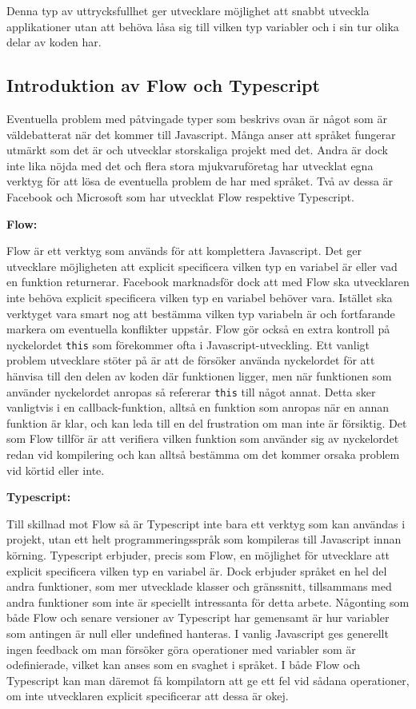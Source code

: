 Denna typ av uttrycksfullhet ger utvecklare möjlighet att snabbt utveckla applikationer utan att behöva låsa sig till vilken typ variabler och i sin tur olika delar av koden har.


\subsection{Introduktion av Flow och Typescript}

Eventuella problem med påtvingade typer som beskrivs ovan är något som är väldebatterat när det kommer till Javascript. Många anser att språket fungerar utmärkt som det är och utvecklar storskaliga projekt med det. Andra är dock inte lika nöjda med det\cite{js-bad} och flera stora mjukvaruföretag har utvecklat egna verktyg för att lösa de eventuella problem de har med språket. Två av dessa är Facebook och Microsoft som har utvecklat Flow\cite{info-flow} respektive Typescript\cite{typescript}.

\textbf{Flow:}

Flow är ett verktyg som används för att komplettera Javascript. Det ger utvecklare möjligheten att explicit specificera vilken typ en variabel är eller vad en funktion returnerar. Facebook marknadsför dock att med Flow ska utvecklaren inte behöva explicit specificera vilken typ en variabel behöver vara. Istället ska verktyget vara smart nog att bestämma vilken typ variabeln är och fortfarande markera om eventuella konflikter uppstår. Flow gör också en extra kontroll på nyckelordet \texttt{this} som förekommer ofta i Javascript-utveckling. Ett vanligt problem utvecklare stöter på är att de försöker använda nyckelordet för att hänvisa till den delen av koden där funktionen ligger, men när funktionen som använder nyckelordet anropas så refererar \texttt{this} till något annat. Detta sker vanligtvis i en callback-funktion, alltså en funktion som anropas när en annan funktion är klar, och kan leda till en del frustration om man inte är försiktig. Det som Flow tillför är att verifiera vilken funktion som använder sig av nyckelordet redan vid kompilering och kan alltså bestämma om det kommer orsaka problem vid körtid eller inte. 

\textbf{Typescript:}

Till skillnad mot Flow så är Typescript inte bara ett verktyg som kan användas i projekt, utan ett helt programmeringsspråk som kompileras till Javascript innan körning. Typescript erbjuder, precis som Flow, en möjlighet för utvecklare att explicit specificera vilken typ en variabel är. Dock erbjuder språket en hel del andra funktioner, som mer utvecklade klasser och gränssnitt, tillsammans med andra funktioner som inte är speciellt intressanta för detta arbete.
Någonting som både Flow och senare versioner av Typescript har gemensamt är hur variabler som antingen är null eller undefined hanteras. I vanlig Javascript ges generellt ingen feedback om man försöker göra operationer med variabler som är odefinierade, vilket kan anses som en svaghet i språket. I både Flow och Typescript kan man däremot få kompilatorn att ge ett fel vid sådana operationer, om inte utvecklaren explicit specificerar att dessa är okej.


